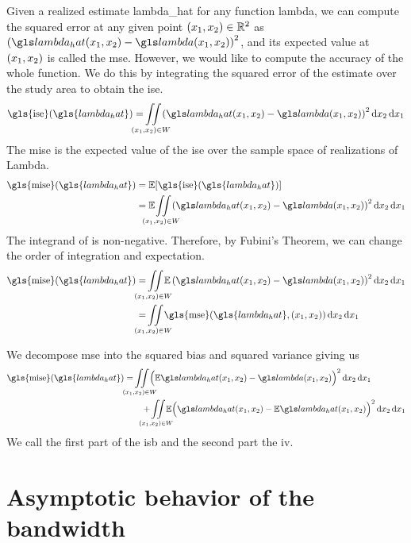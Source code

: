 Given a realized estimate \gls{lambda_hat} for any function \gls{lambda},
we can compute the squared error at any given point $(x_1, x_2) \in \mathbb{R}^2$ as
$\left( \lmbdhat - \lmbd \right)^2$,
and its expected value at $(x_1, x_2)$ is called the \gls{mse}.
However,
we would like to compute the accuracy of the whole function.
We do this by integrating the squared error of the estimate over the study area to obtain the \gls{ise}.
\begin{equation}
\label{eq:ise}
    \mbox{\gls{ise}}(\gls{lambda_hat}) = \iintW{
            \left( \lmbdhat - \lmbd \right)^2
    }
\end{equation}
The \gls{mise} is the expected value of the \gls{ise} over the sample space of realizations of \gls{Lambda}.
\begin{align}
    \mbox{\gls{mise}}(\gls{lambda_hat}) 
        & = \E [\mbox{\gls{ise}}(\gls{lambda_hat})] \nonumber \\
        & = \E \iintW{ \left( \lmbdhat - \lmbd \right)^2 } \label{eq:mise}
\end{align}
The integrand of  is non-negative.
Therefore, by Fubini's Theorem, we can change the order of integration and expectation.
\begin{align}
    \mbox{\gls{mise}}(\gls{lambda_hat}) 
        & = \iintW{ \E \left( \lmbdhat - \lmbd \right)^2 } \nonumber \\
        & = \iintW{ \mbox{\gls{mse}}(\gls{lambda_hat}, \xvec) } \nonumber
\end{align}

We decompose \gls{mse} into the squared bias and squared variance%
giving us
\begin{align}
    \mbox{\gls{mise}}(\gls{lambda_hat}) 
        & = \iintW{ \Big( \E\lmbdhat - \lmbd \Big)^2 } \nonumber \\
        & \qquad + \iintW{ \E \Big( \lmbdhat - \E\lmbdhat \Big)^2 } \label{eq:mise:intbiasvariance}
\end{align}
We call the first part of  the \gls{isb} and the second part the \gls{iv}.

\section{Asymptotic behavior of the bandwidth}
\label{sec:theory:asymptotic_bandwidth}

